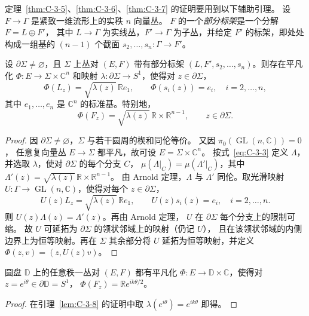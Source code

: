 定理~\ref{thm:C-3-5}、\ref{thm:C-3-6}、\ref{thm:C-3-7} 的证明要用到以下辅助引理。
设 $F\to\Gamma$ 是紧致一维流形上的实秩 $n$ 向量丛。
$F$ 的一个\emph{部分标架}是一个分解 $F=L\oplus F'$，
其中 $L\to\Gamma$ 为实线丛，$F'\to\Gamma$ 为子丛，并给定
$F'$ 的标架，即处处构成一组基的 $(n-1)$ 个截面
$s_2,\ldots,s_n:\Gamma\to F'$。

\begin{lemma}\label{lem:C-3-8}
设 $\partial\Sigma\ne\varnothing$，且 $\Sigma$ 上丛对 $(E,F)$
带有部分标架 $(L,F',s_2,\ldots,s_n)$。则存在平凡化
$\Phi:E\to\Sigma\times\mathbb C^n$ 和映射
$\lambda:\partial\Sigma\to S^1$，使得对 $z\in\partial\Sigma$，
\[
  \Phi(L_z)=\sqrt{\lambda(z)}\,\mathbb R e_1,\qquad
  \Phi(s_i(z))=e_i,\quad i=2,\ldots,n,
\]
其中 $e_1,\ldots,e_n$ 是 $\mathbb C^n$ 的标准基。特别地，
\[
  \Phi(F_z)=\sqrt{\lambda(z)}\,\mathbb R\times\mathbb R^{n-1},
  \qquad z\in\partial\Sigma.
\]
\end{lemma}

\begin{proof}
因 $\partial\Sigma\ne\varnothing$，$\Sigma$ 与若干圆周的楔和同伦等价。
又因 $\pi_0(\operatorname{GL}(n,\mathbb C))=0$，
任意复向量丛 $E\to\Sigma$ 都平凡，故可设 $E=\Sigma\times\mathbb C^n$。
按式~\eqref{eq:C-3-3} 定义 $\Lambda$，并选取 $\lambda$，使对
$\partial\Sigma$ 的每个分支 $C$，
$\mu(\Lambda|_C)=\mu(\Lambda'|_C)$，其中
$\Lambda'(z)=\sqrt{\lambda(z)}\,\mathbb R\times\mathbb R^{n-1}$。
由 Arnold 定理，$\Lambda$ 与 $\Lambda'$ 同伦。取光滑映射
$U:\Gamma\to\operatorname{GL}(n,\mathbb C)$，使得对每个 $z\in\partial\Sigma$，
\[
  U(z)L_z=\sqrt{\lambda(z)}\,\mathbb R e_1,\qquad
  U(z)s_i(z)=e_i,\quad i=2,\ldots,n.
\]
则 $U(z)\Lambda(z)=\Lambda'(z)$。再由 Arnold 定理，
$U$ 在 $\partial\Sigma$ 每个分支上的限制可缩。
故 $U$ 可延拓为 $\partial\Sigma$ 的领状邻域上的映射（仍记 $U$），
且在该领状邻域的内侧边界上为恒等映射。再在 $\Sigma$ 其余部分将 $U$
延拓为恒等映射，并定义 $\Phi(z,v)=(z,U(z)v)$。
\end{proof}

\begin{corollary}\label{cor:C-3-9}
圆盘 $\mathbb D$ 上的任意秩一丛对 $(E,F)$ 都有平凡化
$\Phi:E\to\mathbb D\times\mathbb C$，使得对
$z=e^{i\theta}\in\partial\mathbb D=S^1$，
$\Phi(F_z)=\mathbb R e^{ik\theta/2}$。
\end{corollary}
\begin{proof}
在引理~\ref{lem:C-3-8} 的证明中取 $\lambda(e^{i\theta})=e^{ik\theta}$ 即得。
\end{proof}

